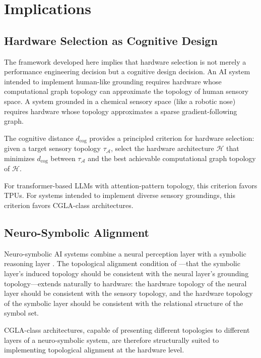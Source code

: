 \documentclass[12pt]{article}
\begin{document}
\section{Implications}

\subsection{Hardware Selection as Cognitive Design}

The framework developed here implies that hardware selection is not merely
a performance engineering decision but a cognitive design decision. An AI
system intended to implement human-like grounding requires hardware whose
computational graph topology can approximate the topology of human sensory
space. A system grounded in a chemical sensory space (like a robotic nose)
requires hardware whose topology approximates a sparse gradient-following
graph.

The cognitive distance $d_{\mathrm{cog}}$ provides a principled criterion
for hardware selection: given a target sensory topology $\tau_{\mathcal{A}}$,
select the hardware architecture $\mathcal{H}$ that minimizes
$d_{\mathrm{cog}}$ between $\tau_{\mathcal{A}}$ and the best achievable
computational graph topology of $\mathcal{H}$.

For transformer-based LLMs with attention-pattern topology, this criterion
favors TPUs. For systems intended to implement diverse sensory groundings,
this criterion favors CGLA-class architectures.

\subsection{Neuro-Symbolic Alignment}

Neuro-symbolic AI systems combine a neural perception layer with a
symbolic reasoning layer \cite{garcez2022}. The topological alignment
condition of \cite{minamoto2026topology}---that the symbolic layer's induced
topology should be consistent with the neural layer's grounding
topology---extends naturally to hardware: the hardware topology of the
neural layer should be consistent with the sensory topology, and the
hardware topology of the symbolic layer should be consistent with the
relational structure of the symbol set.

CGLA-class architectures, capable of presenting different topologies to
different layers of a neuro-symbolic system, are therefore structurally
suited to implementing topological alignment at the hardware level.
\end{document}
